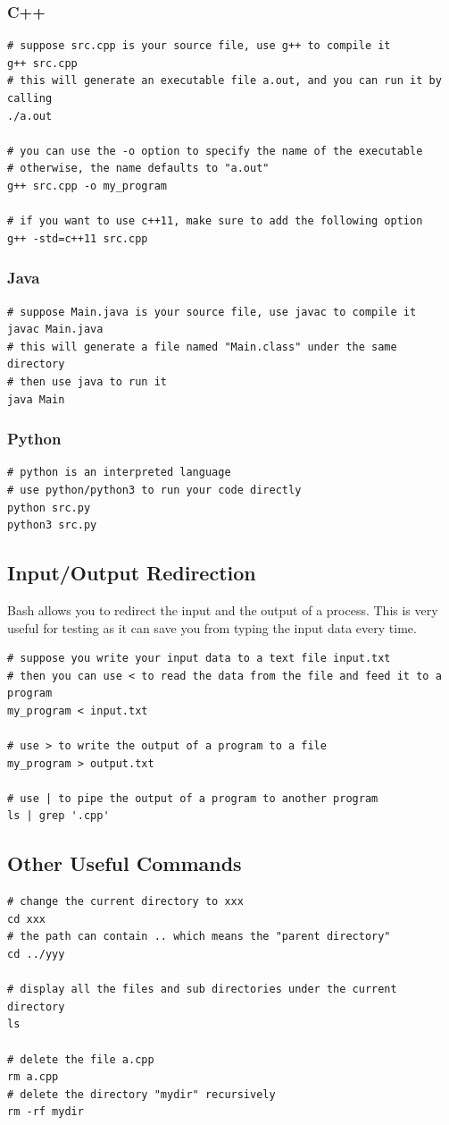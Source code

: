\documentclass {article}
\begin{document}
\subsubsection{C++}
\begin{verbatim}
# suppose src.cpp is your source file, use g++ to compile it
g++ src.cpp
# this will generate an executable file a.out, and you can run it by calling
./a.out

# you can use the -o option to specify the name of the executable
# otherwise, the name defaults to "a.out"
g++ src.cpp -o my_program

# if you want to use c++11, make sure to add the following option
g++ -std=c++11 src.cpp
\end{verbatim}

\subsubsection{Java}
\begin{verbatim}
# suppose Main.java is your source file, use javac to compile it
javac Main.java
# this will generate a file named "Main.class" under the same directory
# then use java to run it
java Main
\end{verbatim}

\subsubsection{Python}
\begin{verbatim}
# python is an interpreted language
# use python/python3 to run your code directly
python src.py
python3 src.py
\end{verbatim}

\newpage
\subsection{Input/Output Redirection}
Bash allows you to redirect the input and the output of a process.
This is very useful for testing as it can save you from typing 
the input data every time.\\
\begin{verbatim}
# suppose you write your input data to a text file input.txt
# then you can use < to read the data from the file and feed it to a program
my_program < input.txt

# use > to write the output of a program to a file
my_program > output.txt

# use | to pipe the output of a program to another program
ls | grep '.cpp'
\end{verbatim}

\subsection{Other Useful Commands}
\begin{verbatim}
# change the current directory to xxx
cd xxx
# the path can contain .. which means the "parent directory"
cd ../yyy

# display all the files and sub directories under the current directory
ls

# delete the file a.cpp
rm a.cpp
# delete the directory "mydir" recursively
rm -rf mydir
\end{verbatim}
\end{document}
